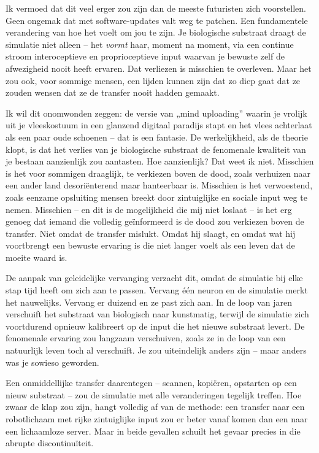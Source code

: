 \documentclass[11pt, twoside, openright]{book}
\begin{document}
Ik vermoed dat dit veel erger zou zijn dan de meeste futuristen zich voorstellen. Geen ongemak dat met software-updates valt weg te patchen. Een fundamentele verandering van hoe het voelt om jou te zijn. Je biologische substraat draagt de simulatie niet alleen -- het \textit{vormt} haar, moment na moment, via een continue stroom interoceptieve en proprioceptieve input waarvan je bewuste zelf de afwezigheid nooit heeft ervaren. Dat verliezen is misschien te overleven. Maar het zou ook, voor sommige mensen, een lijden kunnen zijn dat zo diep gaat dat ze zouden wensen dat ze de transfer nooit hadden gemaakt.

Ik wil dit onomwonden zeggen: de versie van „mind uploading” waarin je vrolijk uit je vleeskostuum in een glanzend digitaal paradijs stapt en het vlees achterlaat als een paar oude schoenen -- dat is een fantasie. De werkelijkheid, als de theorie klopt, is dat het verlies van je biologische substraat de fenomenale kwaliteit van je bestaan aanzienlijk zou aantasten. Hoe aanzienlijk? Dat weet ik niet. Misschien is het voor sommigen draaglijk, te verkiezen boven de dood, zoals verhuizen naar een ander land desoriënterend maar hanteerbaar is. Misschien is het verwoestend, zoals eenzame opsluiting mensen breekt door zintuiglijke en sociale input weg te nemen. Misschien -- en dit is de mogelijkheid die mij niet loslaat -- is het erg genoeg dat iemand die volledig geïnformeerd is de dood zou verkiezen boven de transfer. Niet omdat de transfer mislukt. Omdat hij slaagt, en omdat wat hij voortbrengt een bewuste ervaring is die niet langer voelt als een leven dat de moeite waard is.

De aanpak van geleidelijke vervanging verzacht dit, omdat de simulatie bij elke stap tijd heeft om zich aan te passen. Vervang één neuron en de simulatie merkt het nauwelijks. Vervang er duizend en ze past zich aan. In de loop van jaren verschuift het substraat van biologisch naar kunstmatig, terwijl de simulatie zich voortdurend opnieuw kalibreert op de input die het nieuwe substraat levert. De fenomenale ervaring zou langzaam verschuiven, zoals ze in de loop van een natuurlijk leven toch al verschuift. Je zou uiteindelijk anders zijn -- maar anders was je sowieso geworden.

Een onmiddellijke transfer daarentegen -- scannen, kopiëren, opstarten op een nieuw substraat -- zou de simulatie met alle veranderingen tegelijk treffen. Hoe zwaar de klap zou zijn, hangt volledig af van de methode: een transfer naar een robotlichaam met rijke zintuiglijke input zou er beter vanaf komen dan een naar een lichaamloze server. Maar in beide gevallen schuilt het gevaar precies in die abrupte discontinuïteit.
\end{document}
